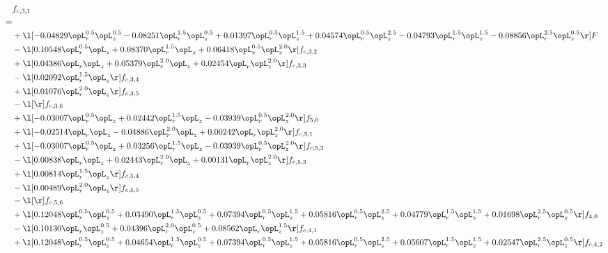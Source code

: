 \begin{alignat}{2} 
\label{eq:f_31_2} 
& f_{c,3,1} \nonumber \\ 
 = \\ 
& + \l[  -0.04829 \opL_r^{0.5} \opL_z^{0.5}   -0.08251 \opL_r^{1.5} \opL_z^{0.5} +  0.01397 \opL_r^{0.5} \opL_z^{1.5} +  0.04574 \opL_r^{0.5} \opL_z^{2.5}   -0.04793 \opL_r^{1.5} \opL_z^{1.5}   -0.08856 \opL_r^{2.5} \opL_z^{0.5}  \r] F \nonumber \\ 
& - \l[  0.10548 \opL_r^{0.5} \opL_z +  0.08370 \opL_r^{1.5} \opL_z +  0.06418 \opL_r^{0.5} \opL_z^{2.0}  \r] f_{c,3,2} \nonumber \\ 
& + \l[  0.04386 \opL_r \opL_z +  0.05379 \opL_r^{2.0} \opL_z +  0.02454 \opL_r \opL_z^{2.0}  \r] f_{c,3,3} \nonumber \\ 
& - \l[  0.02092 \opL_r^{1.5} \opL_z  \r] f_{c,3,4} \nonumber \\ 
& + \l[  0.01076 \opL_r^{2.0} \opL_z  \r] f_{c,3,5} \nonumber \\ 
& - \l[  \r] f_{c,3,6} \nonumber \\ 
& + \l[  -0.03007 \opL_r^{0.5} \opL_z +  0.02442 \opL_r^{1.5} \opL_z   -0.03939 \opL_r^{0.5} \opL_z^{2.0}  \r] f_{5,0} \nonumber \\ 
& + \l[  -0.02514 \opL_r \opL_z   -0.04886 \opL_r^{2.0} \opL_z +  0.00242 \opL_r \opL_z^{2.0}  \r] f_{c,5,1} \nonumber \\ 
& + \l[  -0.03007 \opL_r^{0.5} \opL_z +  0.03256 \opL_r^{1.5} \opL_z   -0.03939 \opL_r^{0.5} \opL_z^{2.0}  \r] f_{c,5,2} \nonumber \\ 
& - \l[  0.00838 \opL_r \opL_z +  0.02443 \opL_r^{2.0} \opL_z +  0.00131 \opL_r \opL_z^{2.0}  \r] f_{c,5,3} \nonumber \\ 
& + \l[  0.00814 \opL_r^{1.5} \opL_z  \r] f_{c,5,4} \nonumber \\ 
& - \l[  0.00489 \opL_r^{2.0} \opL_z  \r] f_{c,5,5} \nonumber \\ 
& - \l[  \r] f_{c,5,6} \nonumber \\ 
& + \l[  0.12048 \opL_r^{0.5} \opL_z^{0.5} +  0.03490 \opL_r^{1.5} \opL_z^{0.5} +  0.07394 \opL_r^{0.5} \opL_z^{1.5} +  0.05816 \opL_r^{0.5} \opL_z^{2.5} +  0.04779 \opL_r^{1.5} \opL_z^{1.5} +  0.01698 \opL_r^{2.5} \opL_z^{0.5}  \r] f_{4,0} \nonumber \\ 
& - \l[  0.10130 \opL_r \opL_z^{0.5} +  0.04396 \opL_r^{2.0} \opL_z^{0.5} +  0.08562 \opL_r \opL_z^{1.5}  \r] f_{c,4,1} \nonumber \\ 
& + \l[  0.12048 \opL_r^{0.5} \opL_z^{0.5} +  0.04654 \opL_r^{1.5} \opL_z^{0.5} +  0.07394 \opL_r^{0.5} \opL_z^{1.5} +  0.05816 \opL_r^{0.5} \opL_z^{2.5} +  0.05607 \opL_r^{1.5} \opL_z^{1.5} +  0.02547 \opL_r^{2.5} \opL_z^{0.5}  \r] f_{c,4,2} \nonumber \\ 

\end{alignat}
